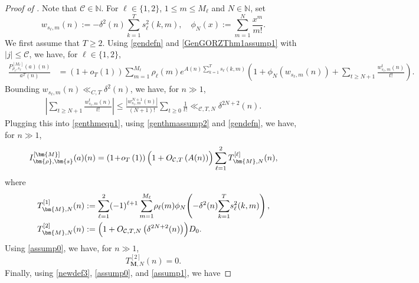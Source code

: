 \documentclass[11pt,reqno,a4paper]{amsart}
\renewcommand{\d}{{\delta}}
\renewcommand{\(}{\left\(}
\renewcommand{\)}{\right\)}
\numberwithin{equation}{section}
\theoremstyle{plain}
\theoremstyle{definition} %
\numberwithin{equation}{section}
\begin{document}
\begin{proof}[Proof of ]
  Note that 
 $\mathcal{C}\in \mathbb{N}$. 
For $\ell\in \{1,2\}$, $1\le m\le M_{\ell}$ and $N\in \mathbb{N}$, set 
	\[w_{s_{\ell},m}(n):=-\d^2(n)\sum_{k=1}^{T}s^2_{\ell}(k,m),\quad \phi_N(x):=\sum_{m=1}^{N}\frac{x^m}{m!}.\]
We first assume that $T\ge 2$. Using \eqref{gendefn} and \ref{GenGORZThm1assump1} with $|j|\le \mathcal{C}$, we have, for $\ell\in \{1,2\}$, 
	\begin{align}\label{genthmeqn1}
	\frac{P^{[M_{\ell}]}_{\rho_{\ell},s_{\ell}}(a)(n)}{a^{T}(n)}\!&=\!
\left(1\!+\!o_T\left(1\right)\right)\!\sum_{m=1}^{M_{\ell}}\!\rho_{\ell}(m)e^{A(n)\!\sum_{k=1}^{T}\!s_{\ell}(k,m)}%
\left(\!1\!+\!\phi_{N}\!\left(w_{s_{\ell},m}(n)\right)\!+\!\!\!\!\sum_{t\ge N+1}\!\frac{w^t_{s_{\ell},m}(n)}{t!}\!\right).
	\end{align}
	Bounding $w_{s_{\ell},m}(n)\ll_{C,T} \d^2(n)$, %
	we have, for $n\!\gg\!1$,  
	\begin{align*}%
	\left|\sum_{t\ge N+1}\frac{w^t_{s_{\ell},m}(n)}{t!}\right|
	\le \frac{\left|w^{N+1}_{s_{\ell},m}(n)\right|}{\left(N+1\right)!}\sum_{t\ge 0}\frac{1}{t!}\ll_{\mathcal{C},T,N}\d^{2N+2}(n).	\end{align*}
Plugging %
this into \eqref{genthmeqn1}, using \ref{genthmassump2} and \eqref{gendefn}, we have, for $n\!\gg\!1$, 
\begin{align}\label{genthmeqn15}
I^{[\bm{M}]}_{\bm{\rho},\bm{s}}(a)(n)=\left(1\!+\!o_{T}\left(1\right)\right)\Bigl(1+O_{\mathcal{C}, T}\left(A(n)\right)\Bigr)\sum_{\ell=1}^{2}T^{[\ell]}_{\bm{M},N}(n),
\end{align}
where 
	\begin{align*}
	T^{[1]}_{\bm{M},N}(n)&:=\sum_{\ell=1}^2 (-1)^{\ell+1}\sum_{m=1}^{M_{\ell}}\!\rho_{\ell}(m)\phi_N\!\left(-\d^2(n)\!\sum_{k=1}^{T}\!s^2_{\ell}(k,m)\right),\\
	T^{[2]}_{\bm{M},N}(n)&:=\Bigl(1+O_{\mathcal{C},T,N}\left(\d^{2N+2}(n)\right)\Bigr)D_0.
	\end{align*}
Using  \ref{assump0}, we have, for $n\!\gg\!1$, 
	\begin{equation}\label{genthmeqn16}
	T^{[2]}_{\bm{M}, N}(n)=0.
	\end{equation}
 Finally, using \eqref{newdef3}, \ref{assump0}, and \ref{assump1}, we have 

\end{proof}
\end{document}
